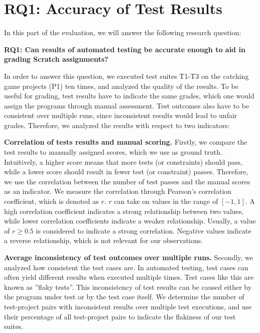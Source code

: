 \section{RQ1: Accuracy of Test Results}
\label{sec:rq1}

In this part of the evaluation, we will answer the following research question:

\begin{center}\begin{minipage}{.9\textwidth}
    \textbf{RQ1: Can results of automated testing be accurate enough to aid in grading Scratch assignments?}
\end{minipage}\end{center}

\noindent In order to answer this question,
we executed test suites T1-T3 on the catching game projects (P1) ten times,
and analyzed the quality of the results.
To be useful for grading,
test results have to indicate the same grades,
which one would assign the programs through manual assessment.
Test outcomes also have to be consistent over multiple runs,
since inconsistent results would lead to unfair grades.
Therefore, we analyzed the results with respect to two indicators:
\parspace

\textbf{Correlation of tests results and manual scoring.}
Firstly, we compare the test results to manually assigned scores, which we use as ground truth.
Intuitively, a higher score means that more tests (or constraints) should pass,
while a lower score should result in fewer test (or constraint) passes.
Therefore, we use the correlation between the number of test passes and the manual scores as an indicator.
We measure the correlation through Pearson's correlation coefficient, which is denoted as $r$.
$r$ can take on values in the range of $[-1, 1]$.
A high correlation coefficient indicates a strong relationship between two values,
while lower correlation coefficients indicate a weaker relationship.
Usually, a value of $r \ge 0.5$ is considered to indicate a strong correlation.
Negative values indicate a reverse relationship, which is not relevant for our observations.
\parspace

\textbf{Average inconsistency of test outcomes over multiple runs.}
Secondly, we analyzed how consistent the test cases are.
In automated testing, test cases can often yield different results when executed multiple times.
Test cases like this are known as ''flaky tests''.
This inconsistency of test results can be caused either by the program under test or by the test case itself.
We determine the number of test-project pairs with inconsistent results over multiple test executions,
and use their percentage of all test-project pairs to indicate the flakiness of our test suites.

